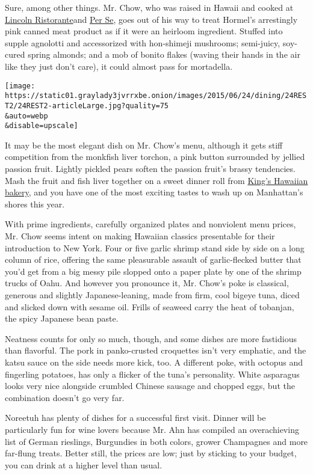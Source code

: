 Sure, among other things. Mr. Chow, who was raised in Hawaii and cooked
at
\href{http://www.nytimes3xbfgragh.onion/2010/11/24/dining/reviews/24rest.html}{Lincoln
Ristorante}and
\href{http://www.nytimes3xbfgragh.onion/2011/10/12/dining/reviews/per-se-nyc-restaurant-review.html}{Per
Se}, goes out of his way to treat Hormel's arrestingly pink canned meat
product as if it were an heirloom ingredient. Stuffed into supple
agnolotti and accessorized with hon-shimeji mushrooms; semi-juicy,
soy-cured spring almonds; and a mob of bonito flakes (waving their hands
in the air like they just don't care), it could almost pass for
mortadella.

\texttt{[image: https://static01.graylady3jvrrxbe.onion/images/2015/06/24/dining/24REST2/24REST2-articleLarge.jpg?quality=75\\\&auto=webp\\\&disable=upscale]}

It may be the most elegant dish on Mr. Chow's menu, although it gets
stiff competition from the monkfish liver torchon, a pink button
surrounded by jellied passion fruit. Lightly pickled pears soften the
passion fruit's brassy tendencies. Mash the fruit and fish liver
together on a sweet dinner roll from
\href{http://www.kingshawaiian.com/}{King's Hawaiian bakery}, and you
have one of the most exciting tastes to wash up on Manhattan's shores
this year.

With prime ingredients, carefully organized plates and nonviolent menu
prices, Mr. Chow seems intent on making Hawaiian classics presentable
for their introduction to New York. Four or five garlic shrimp stand
side by side on a long column of rice, offering the same pleasurable
assault of garlic-flecked butter that you'd get from a big messy pile
slopped onto a paper plate by one of the shrimp trucks of Oahu. And
however you pronounce it, Mr. Chow's poke is classical, generous and
slightly Japanese-leaning, made from firm, cool bigeye tuna, diced and
slicked down with sesame oil. Frills of seaweed carry the heat of
tobanjan, the spicy Japanese bean paste.

Neatness counts for only so much, though, and some dishes are more
fastidious than flavorful. The pork in panko-crusted croquettes isn't
very emphatic, and the katsu sauce on the side needs more kick, too. A
different poke, with octopus and fingerling potatoes, has only a flicker
of the tuna's personality. White asparagus looks very nice alongside
crumbled Chinese sausage and chopped eggs, but the combination doesn't
go very far.

Noreetuh has plenty of dishes for a successful first visit. Dinner will
be particularly fun for wine lovers because Mr. Ahn has compiled an
overachieving list of German rieslings, Burgundies in both colors,
grower Champagnes and more far-flung treats. Better still, the prices
are low; just by sticking to your budget, you can drink at a higher
level than usual.

